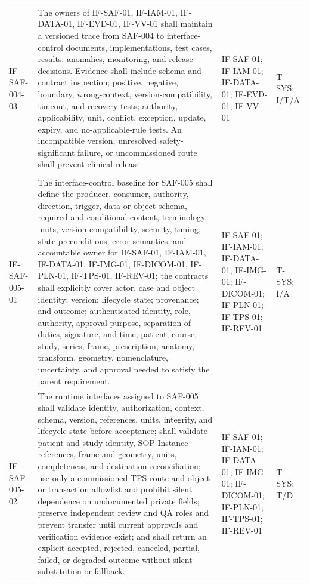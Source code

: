 \documentclass[11pt,letterpaper]{article}
\begin{document}
\begin{scriptsize}
\begin{longtable}{@{}L{0.14\textwidth}L{0.49\textwidth}L{0.19\textwidth}L{0.10\textwidth}@{}}
\addlinespace[2pt]
\mbox{IF-SAF-004-03} & The owners of IF-SAF-01, IF-IAM-01, IF-DATA-01, IF-EVD-01, IF-VV-01 shall maintain a versioned trace from SAF-004 to interface-control documents, implementations, test cases, results, anomalies, monitoring, and release decisions. Evidence shall include schema and contract inspection; positive, negative, boundary, wrong-context, version-compatibility, timeout, and recovery tests; authority, applicability, unit, conflict, exception, update, expiry, and no-applicable-rule tests. An incompatible version, unresolved safety-significant failure, or uncommissioned route shall prevent clinical release. & IF-SAF-01; IF-IAM-01; IF-DATA-01; IF-EVD-01; IF-VV-01 & T-SYS; I\slash\allowbreak{}T\slash\allowbreak{}A \\
\addlinespace[2pt]
 \\
\addlinespace[2pt]
\mbox{IF-SAF-005-01} & The interface-control baseline for SAF-005 shall define the producer, consumer, authority, direction, trigger, data or object schema, required and conditional content, terminology, units, version compatibility, security, timing, state preconditions, error semantics, and accountable owner for IF-SAF-01, IF-IAM-01, IF-DATA-01, IF-IMG-01, IF-DICOM-01, IF-PLN-01, IF-TPS-01, IF-REV-01; the contracts shall explicitly cover actor, case and object identity; version; lifecycle state; provenance; and outcome; authenticated identity, role, authority, approval purpose, separation of duties, signature, and time; patient, course, study, series, frame, prescription, anatomy, transform, geometry, nomenclature, uncertainty, and approval needed to satisfy the parent requirement. & IF-SAF-01; IF-IAM-01; IF-DATA-01; IF-IMG-01; IF-DICOM-01; IF-PLN-01; IF-TPS-01; IF-REV-01 & T-SYS; I\slash\allowbreak{}A \\
\addlinespace[2pt]
\mbox{IF-SAF-005-02} & The runtime interfaces assigned to SAF-005 shall validate identity, authorization, context, schema, version, references, units, integrity, and lifecycle state before acceptance; shall validate patient and study identity, SOP Instance references, frame and geometry, units, completeness, and destination reconciliation; use only a commissioned TPS route and object or transaction allowlist and prohibit silent dependence on undocumented private fields; preserve independent review and QA roles and prevent transfer until current approvals and verification evidence exist; and shall return an explicit accepted, rejected, canceled, partial, failed, or degraded outcome without silent substitution or fallback. & IF-SAF-01; IF-IAM-01; IF-DATA-01; IF-IMG-01; IF-DICOM-01; IF-PLN-01; IF-TPS-01; IF-REV-01 & T-SYS; T\slash\allowbreak{}D \\

\end{longtable}
\end{scriptsize}
\end{document}
